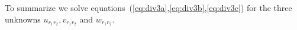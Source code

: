 \documentclass[10pt]{article}
\begin{document}
To summarize we solve equations~(\ref{eq:div3a},\ref{eq:div3b},\ref{eq:div3c}) for the
three unknowns $u_{r_1 r_2},v_{r_1 r_2}$ and $w_{r_1 r_2}$.

\baselineskip

% 
% 
% 
% 
\end{document}
